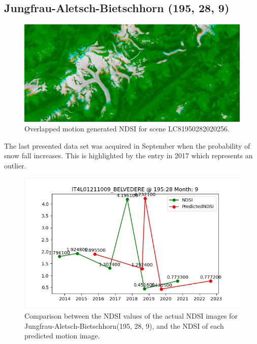 \documentclass[12pt, a4paper]{report}
\begin{document}
	\newpage{}
	
	\subsection{Jungfrau-Aletsch-Bietschhorn (195, 28, 9)}
	
	\begin{figure}[h!]
		\centering
		\includegraphics[width=\linewidth]{../images/experiment_1950289.png}
		\caption{Overlapped motion generated NDSI for scene LC81950282020256.}
		\label{fig:experiment_1950289_image}
	\end{figure}

	The last presented data set was acquired in September when the probability of snow fall increases. This is highlighted by the entry in 2017 which represents an outlier.
	
	\begin{figure}[h!]
		\centering
		\includegraphics[scale=0.5]{../images/experiment_195289.png}
		\caption{Comparison between the NDSI values of the actual NDSI images for Jungfrau-Aletsch-Bietschhorn(195, 28, 9), and the NDSI of each predicted motion image.}
		\label{fig:jungfrau_195289}
	\end{figure}
	
\end{document}
